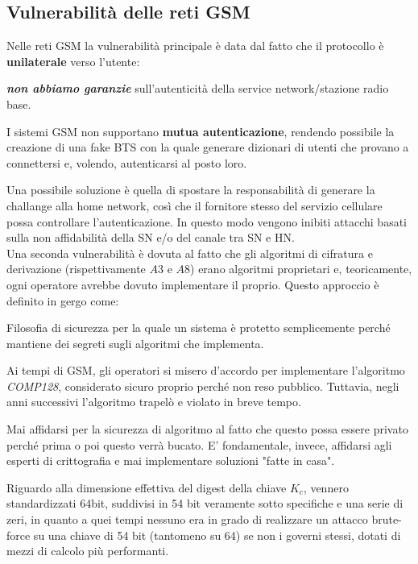 \subsection{Vulnerabilità delle reti GSM}
Nelle reti GSM la vulnerabilità principale è data dal fatto che il protocollo è \textbf{unilaterale} verso l'utente:
\begin{remark}
    \textbf{\textit{non abbiamo garanzie}}  sull'autenticità della service network/stazione radio base\footnotemark.
\end{remark}
\begin{proposition}
I sistemi GSM non supportano \textbf{mutua autenticazione}, rendendo possibile la creazione di una fake BTS con la quale generare dizionari di utenti che provano a connettersi e, volendo, autenticarsi al posto loro.
\end{proposition}
Una possibile soluzione è quella di spostare la responsabilità di generare la challange alla home network, così che il fornitore stesso del servizio cellulare possa controllare l'autenticazione. In questo modo vengono inibiti attacchi basati sulla non affidabilità della SN e/o del canale tra SN e HN.\\
Una seconda vulnerabilità è dovuta al fatto che gli algoritmi di cifratura e derivazione (rispettivamente $A3$ e $A8$) erano algoritmi proprietari e, teoricamente, ogni operatore avrebbe dovuto implementare il proprio. Questo approccio è definito in gergo come:
\begin{definition}
\label{def:secbyobsc}
Filosofia di sicurezza per la quale un sistema è protetto semplicemente perché mantiene dei segreti sugli algoritmi che implementa.
\end{definition}
Ai tempi di GSM, gli operatori si misero d'accordo per implementare l'algoritmo \textit{COMP128}, considerato sicuro proprio perché non reso pubblico. Tuttavia, negli anni successivi l'algoritmo trapelò e violato in breve tempo.\\
\begin{remark}
Mai affidarsi per la sicurezza di algoritmo al fatto che questo possa essere privato perché prima o poi questo verrà bucato. E' fondamentale, invece, affidarsi agli esperti di crittografia e mai implementare soluzioni "fatte in casa".
\end{remark}
\begin{remark}
Riguardo alla dimensione effettiva del digest della chiave $K_c$, vennero standardizzati 64bit, suddivisi in 54 bit veramente sotto specifiche e una serie di zeri, in quanto a quei tempi nessuno era in grado di realizzare un attacco brute-force su una chiave di 54 bit (tantomeno su 64) se non i governi stessi, dotati di mezzi di calcolo più performanti.
\end{remark}
